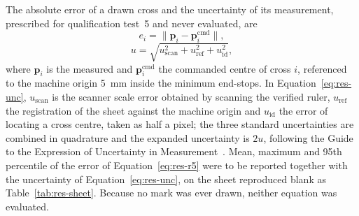 The absolute error of a drawn cross and the uncertainty of its measurement, prescribed for qualification test~5 and never evaluated, are
\begin{equation}
\label{eq:res-r5}
e_i=\lVert\mathbf{p}_i-\mathbf{p}_i^{\mathrm{cmd}}\rVert,
\end{equation}
\begin{equation}
\label{eq:res-unc}
u=\sqrt{u_{\mathrm{scan}}^2+u_{\mathrm{ref}}^2+u_{\mathrm{id}}^2},
\end{equation}
where $\mathbf{p}_i$ is the measured and $\mathbf{p}_i^{\mathrm{cmd}}$ the commanded centre of cross $i$, referenced to the machine origin 5~mm inside the minimum end-stops.
In Equation~\ref{eq:res-unc}, $u_{\mathrm{scan}}$ is the scanner scale error obtained by scanning the verified ruler, $u_{\mathrm{ref}}$ the registration of the sheet against the machine origin and $u_{\mathrm{id}}$ the error of locating a cross centre, taken as half a pixel; the three standard uncertainties are combined in quadrature and the expanded uncertainty is $2u$, following the Guide to the Expression of Uncertainty in Measurement~\cite{jcgm2008}.
Mean, maximum and 95th percentile of the error of Equation~\ref{eq:res-r5} were to be reported together with the uncertainty of Equation~\ref{eq:res-unc}, on the sheet reproduced blank as Table~\ref{tab:res-sheet}.
Because no mark was ever drawn, neither equation was evaluated.
